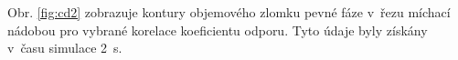 Obr. \ref{fig:cd2} zobrazuje kontury objemového zlomku pevné fáze v~řezu míchací nádobou pro vybrané korelace koeficientu odporu. Tyto údaje byly získány v~času simulace \SI{2}{\second}. 
\begin{figure}[h!]
 \centering

  \qquad             

\end{figure}
